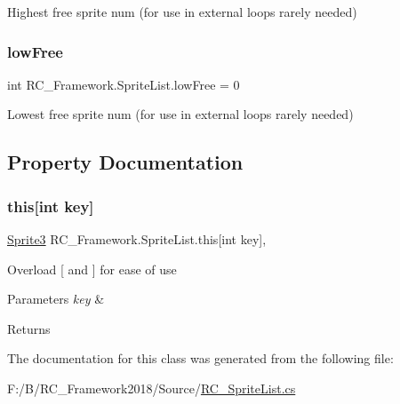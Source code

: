 Highest free sprite num (for use in external loops rarely needed) 

\mbox{\label{class_r_c___framework_1_1_sprite_list_ac5f0c7b4e89b70c3ca6d87c45d874ad9}} 
\subsubsection{\texorpdfstring{low\+Free}{lowFree}}
{\footnotesize\ttfamily int R\+C\+\_\+\+Framework.\+Sprite\+List.\+low\+Free = 0}



Lowest free sprite num (for use in external loops rarely needed) 



\subsection{Property Documentation}
\mbox{\label{class_r_c___framework_1_1_sprite_list_ad32b304d8023b1a91a3021545436c4e5}} 
\subsubsection{\texorpdfstring{this[int key]}{this[int key]}}
{\footnotesize\ttfamily \mbox{\hyperlink{class_r_c___framework_1_1_sprite3}{Sprite3}} R\+C\+\_\+\+Framework.\+Sprite\+List.\+this\mbox{[}int key\mbox{]}\hspace{0.3cm}{\ttfamily [get]}, {\ttfamily [set]}}



Overload \mbox{[} and \mbox{]} for ease of use 


\begin{DoxyParams}{Parameters}
{\em key} & \\
\hline
\end{DoxyParams}
\begin{DoxyReturn}{Returns}

\end{DoxyReturn}


The documentation for this class was generated from the following file\+:\begin{DoxyCompactItemize}
\item 
F\+:/\+B/\+R\+C\+\_\+\+Framework2018/\+Source/\mbox{\hyperlink{_r_c___sprite_list_8cs}{R\+C\+\_\+\+Sprite\+List.\+cs}}\end{DoxyCompactItemize}
